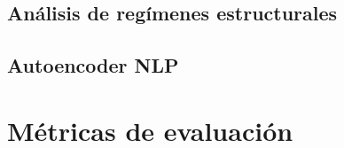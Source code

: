 \subsection{Análisis de regímenes estructurales}

\subsection{Autoencoder NLP}

\section{Métricas de evaluación}
